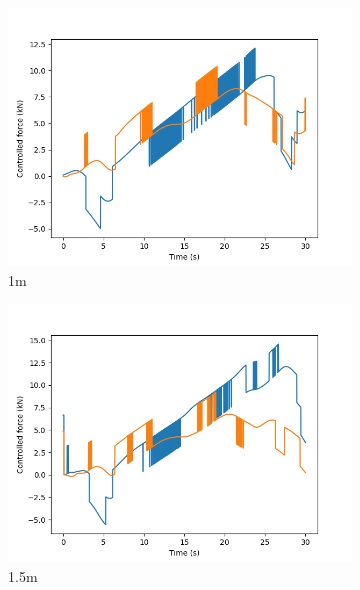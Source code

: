 \documentclass[class=article, crop=false]{standalone}
\begin{document}
\begin{figure}
    \vfill
    \begin{subfigure}[b]{0.48\textwidth}
        \centering
        \includegraphics{scenario1/rov-0m/1.0m/usv_forces}
        \caption{1m}
        \label{}
    \end{subfigure}
    \hfill
    \begin{subfigure}[b]{0.48\textwidth}
        \centering
        \includegraphics{scenario1/rov-0m/1.5m/usv_forces}
        \caption{1.5m}
        \label{}
    \end{subfigure}
    \vfill
    \begin{subfigure}[b]{0.48\textwidth}
        \centering

\end{subfigure}
\end{figure}
\end{document}
